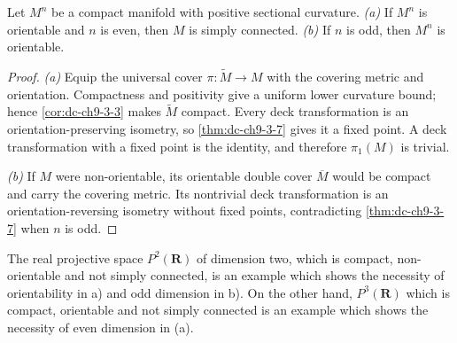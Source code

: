 \begin{corollary}[Synge]
  \label{cor:dc-ch9-3-10}
  Let $M^n$ be a compact manifold with positive sectional curvature.
  \emph{(a)} If $M^n$ is orientable and $n$ is even, then $M$ is simply connected.
  \emph{(b)} If $n$ is odd, then $M^n$ is orientable.
\end{corollary}
\begin{proof}
  \sketch
  \emph{(a)} Equip the universal cover $\pi:\tilde M\to M$ with the
  covering metric and orientation. Compactness and positivity give a uniform
  lower curvature bound; hence \cref{cor:dc-ch9-3-3} makes $\tilde M$
  compact. Every deck transformation is an orientation-preserving isometry, so
  \cref{thm:dc-ch9-3-7} gives it a fixed point. A deck transformation with a
  fixed point is the identity, and therefore $\pi_1(M)$ is trivial.

  \emph{(b)} If $M$ were non-orientable, its orientable double cover
  $\overline M$ would be compact and carry the covering metric. Its nontrivial
  deck transformation is an orientation-reversing isometry without fixed
  points, contradicting \cref{thm:dc-ch9-3-7} when $n$ is odd.
\end{proof}
\begin{remark}
  \label{rem:dc-ch9-3-11}
  The real projective space $P^2(\mathbf{R})$ of dimension two, which is compact,
  non-orientable and not simply connected, is an example which shows the necessity of
  orientability in a) and odd dimension in b). On the other hand, $P^3(\mathbf{R})$
  which is compact, orientable and not simply connected is an example which shows the
  necessity of even dimension in (a).
\end{remark}

